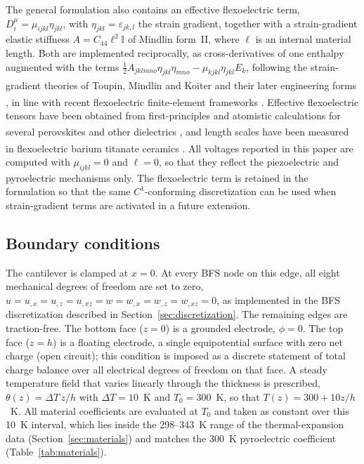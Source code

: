\documentclass[a4paper, 11pt, twoside]{article}
\newcommand{\supercite}[1]{\!\!\textsuperscript{\cite{#1}}}
\begin{document}
The general formulation also contains an effective flexoelectric term,
$D_i^\mu=\mu_{ijkl}\eta_{jkl}$, with $\eta_{jkl}=\varepsilon_{jk,l}$ the strain
gradient, together with a strain-gradient elastic stiffness
$A=C_{44}\ell^2\mathbb{I}$ of Mindlin form~II, where $\ell$ is an internal material
length. Both are implemented reciprocally, as cross-derivatives of one enthalpy
augmented with the terms
$\tfrac12A_{jklmno}\eta_{jkl}\eta_{mno}-\mu_{kjkl}\eta_{jkl}E_k$, following the
strain-gradient theories of Toupin, Mindlin and Koiter
\supercite{Toupin1962,Mindlin1964,MindlinEshel1968} and their later engineering forms
\supercite{FleckHutchinson1997,Lam2003,AskesAifantis2011}, in line with recent flexoelectric
finite-element frameworks
\supercite{Mao2016,MaoPurohit2014,Abdollahi2014}. Effective flexoelectric tensors have
been obtained from first-principles and atomistic calculations for several perovskites
and other dielectrics
\supercite{MarangantiSharma2009,HongVanderbilt2011,Stengel2013}, and length scales have
been measured in flexoelectric barium titanate ceramics
\supercite{MaCross2006,Huang2007}. All voltages reported in this paper are computed with
$\mu_{ijkl}=0$ and $\ell=0$, so that they reflect the piezoelectric and pyroelectric
mechanisms only. The flexoelectric term is retained in the formulation so that the
same $C^1$-conforming discretization can be used when strain-gradient terms are
activated in a future extension.

\subsection{Boundary conditions}
\label{sec:bcs}

The cantilever is clamped at $x=0$. At every BFS node on this edge, all eight mechanical
degrees of freedom are set to zero,
$u=u_{,x}=u_{,z}=u_{,xz}=w=w_{,x}=w_{,z}=w_{,xz}=0$, as implemented in the BFS
discretization described in Section~\ref{sec:discretization}. The remaining edges are
traction-free. The bottom face ($z=0$) is a grounded electrode, $\phi=0$. The top face
($z=h$) is a floating electrode, a single equipotential surface with zero net charge
(open circuit); this condition is imposed as a discrete statement of total charge
balance over all electrical degrees of freedom on that face. A steady temperature field
that varies linearly through the thickness is prescribed,
$\theta(z)=\Delta T\,z/h$ with $\Delta T=10$~K and $T_0=300$~K, so that
$T(z)=300+10z/h$~K. All material coefficients are evaluated at $T_0$ and taken as
constant over this 10~K interval, which lies inside the 298--343~K range of the
thermal-expansion data (Section~\ref{sec:materials}) and matches the 300~K
pyroelectric coefficient (Table~\ref{tab:materials}).
\end{document}
